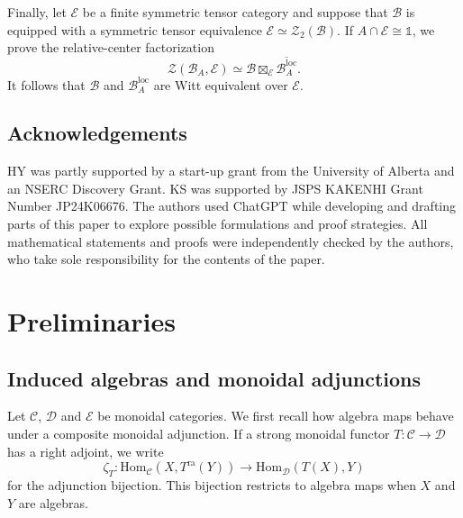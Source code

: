 \documentclass[11pt,reqno]{amsart}
\numberwithin{equation}{section}
\theoremstyle{plain}
\theoremstyle{definition}
\theoremstyle{remark}
\newcommand{\unit}{\mathds{1}}
\newcommand{\B}{\mathcal{B}}
\newcommand{\C}{\mathcal{C}}
\newcommand{\D}{\mathcal{D}}
\newcommand{\E}{\mathcal{E}}
\newcommand{\Z}{\mathcal{Z}}
\newcommand{\loc}{\mathrm{loc}}
\newcommand{\Hom}{\mathrm{Hom}}
\newcommand{\ra}{\mathrm{ra}}
\begin{document}
Finally, let $\E$ be a finite symmetric tensor category and suppose that
$\B$ is equipped with a symmetric tensor equivalence
$\E\simeq\Z_2(\B)$. If $A\cap\E\cong\unit$, we prove the relative-center
factorization
\[
  \Z(\B_A,\E)
  \simeq
  \B\boxtimes_{\E}\overline{\B_A^{\loc}}.
\]
It follows that $\B$ and $\B_A^{\loc}$ are Witt equivalent over $\E$.


\subsection*{Acknowledgements}
HY was partly supported by a start-up grant from the University of Alberta and an NSERC Discovery Grant. KS was supported by JSPS KAKENHI Grant Number JP24K06676. The authors used ChatGPT while developing and drafting parts of this paper to explore possible formulations and proof strategies. All mathematical statements and proofs were independently checked by the authors, who take sole responsibility for the contents of the paper.


\section{Preliminaries}\label{sec:preliminaries}


\subsection{Induced algebras and monoidal adjunctions}
\label{subsec:induced-transparent-algebra}

Let $\C$, $\D$ and $\E$ be monoidal categories. 
We first recall how algebra maps behave under a composite monoidal
adjunction. If a strong monoidal functor $T:\C\to\D$ has a right adjoint,
we write
\[
  \zeta_T:\Hom_{\C}(X,T^{\ra}(Y))
  \longrightarrow
  \Hom_{\D}(T(X),Y)
\]
for the adjunction bijection. This bijection restricts to algebra maps when
$X$ and $Y$ are algebras.
\end{document}
